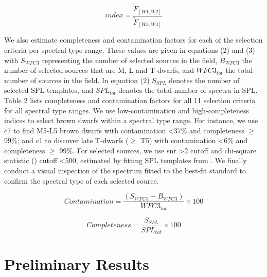 \documentclass[preprint]{aastex}
\begin{document}
\begin{equation}
    index=\frac{\widetilde{F}_{[W1, W2]}}{\widetilde{F}_{[W3, W4]}}
\end{equation}

We also estimate completeness and contamination factors for each of the selection criteria per spectral type range. These values are given in equations (2) and (3) with $S_{WFC3}$ representing the number of selected sources in the field, $B_{WFC3}$ the number of selected sources that are M, L and T-dwarfs, and $WFC3_{tot}$ the total number of sources in the field. In equation (2) $S_{SPL}$ denotes the number of selected SPL templates, and $SPL_{tot}$ denotes the total number of spectra in SPL. Table 2 lists completeness and contamination factors for all 11 selection criteria for all spectral type ranges. We use low-contamination and high-completeness indices to select brown dwarfs within a spectral type range. For instance, we use c7 to find M5-L5 brown dwarfs with contamination \textless 37\% and completeness $\geq$ 99\%; and c1 to discover late T-dwarfs ($\geq$ T5) with contamination \textless 6\% and completeness $\geq$ 99\%. For selected sources, we use snr \textgreater 2 cutoff and chi-square  statistic (\citealt{2010ApJS..190..100K}) cutoff \textless 500,  estimated by fitting SPL templates from \citet{2014arXiv1406.4887B}. We finally conduct a visual inspection of the spectrum fitted to the best-fit standard to confirm the spectral type of each selected source.

\begin{equation}
    Contamination= \frac{(S_{WFC3}-B_{WFC3})}{WFC3_{tot}}\times 100
\end{equation}

\begin{equation}
    Completeness= \frac{S_{SPL}}{SPL_{tot}}\times 100
\end{equation}



\section{Preliminary Results}
\end{document}
